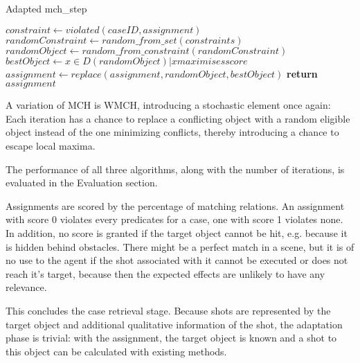 \begin{algorithm}
    \caption{Adapted mch\_step}\label{algo:mch_step}
    \begin{algorithmic}[1]
        \State $constraint \gets violated(caseID, assignment)$
        \State $randomConstraint\gets random\_from\_set(constraints)$
        \State $randomObject \gets random\_from\_constraint(randomConstraint)$
        \State $bestObject \gets {x \in D(randomObject) \vert x maximises score}$
        \State $assignment \gets replace(assignment, randomObject, bestObject)$
        \State \textbf{return} $assignment$
        \EndProcedure
    \end{algorithmic}
\end{algorithm}

A variation of MCH is WMCH, introducing a stochastic element once again: Each iteration has a chance to replace a conflicting object with a random eligible object instead of the one minimizing conflicts, thereby introducing a chance to escape local maxima.\cite{KapKis}

The performance of all three algorithms, along with the number of iterations, is evaluated in the Evaluation section.

Assignments are scored by the percentage of matching relations. An assignment with score 0 violates every predicates for a case, one with score 1 violates none. In addition, no score is granted if the target object cannot be hit, e.g. because it is hidden behind obstacles.
There might be a perfect match in a scene, but it is of no use to the agent if the shot associated with it cannot be executed or does not reach it's target, because then the expected effects are unlikely to have any relevance.

This concludes the case retrieval stage. Because shots are represented by the target object and additional qualitative information of the shot, the adaptation phase is trivial: with the assignment, the target object is known and a shot to this object can be calculated with existing methods.
